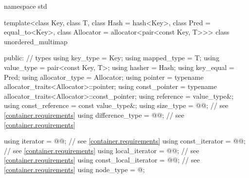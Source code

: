 %
\begin{codeblock}
namespace std {
  template<class Key,
           class T,
           class Hash = hash<Key>,
           class Pred = equal_to<Key>,
           class Allocator = allocator<pair<const Key, T>>>
  class unordered_multimap {
  public:
    // types
    using key_type             = Key;
    using mapped_type          = T;
    using value_type           = pair<const Key, T>;
    using hasher               = Hash;
    using key_equal            = Pred;
    using allocator_type       = Allocator;
    using pointer              = typename allocator_traits<Allocator>::pointer;
    using const_pointer        = typename allocator_traits<Allocator>::const_pointer;
    using reference            = value_type&;
    using const_reference      = const value_type&;
    using size_type            = @@; // see \ref{container.requirements}
    using difference_type      = @@; // see \ref{container.requirements}

    using iterator             = @@; // see \ref{container.requirements}
    using const_iterator       = @@; // see \ref{container.requirements}
    using local_iterator       = @@; // see \ref{container.requirements}
    using const_local_iterator = @@; // see \ref{container.requirements}
    using node_type            = @\unspec@;

}}
\end{codeblock}
